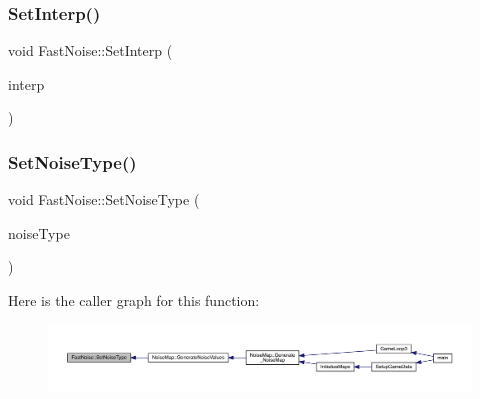 \mbox{\label{class_fast_noise_a5db11de37bebf7a99f6788a9ae9d7bf9}} 
\subsubsection{\texorpdfstring{Set\+Interp()}{SetInterp()}}
{\footnotesize\ttfamily void Fast\+Noise\+::\+Set\+Interp (\begin{DoxyParamCaption}\item[{\mbox{\hyperlink{class_fast_noise_a60969f626ea3ea3504ea51d789f19a33}{Interp}}}]{interp }\end{DoxyParamCaption})\hspace{0.3cm}{\ttfamily [inline]}}

\mbox{\label{class_fast_noise_ae6cb2170c036bde4bc56ad7d0303e4bb}} 
\subsubsection{\texorpdfstring{Set\+Noise\+Type()}{SetNoiseType()}}
{\footnotesize\ttfamily void Fast\+Noise\+::\+Set\+Noise\+Type (\begin{DoxyParamCaption}\item[{\mbox{\hyperlink{class_fast_noise_a77adcfdc4d6e9410ef6099553509d09f}{Noise\+Type}}}]{noise\+Type }\end{DoxyParamCaption})\hspace{0.3cm}{\ttfamily [inline]}}

Here is the caller graph for this function\+:
\nopagebreak
\begin{figure}[H]
\begin{center}
\leavevmode
\includegraphics[width=350pt]{class_fast_noise_ae6cb2170c036bde4bc56ad7d0303e4bb_icgraph}
\end{center}
\end{figure}
\mbox{\label{class_fast_noise_a2efb595ec8bc18541a3739c6bd9b7567}} 
